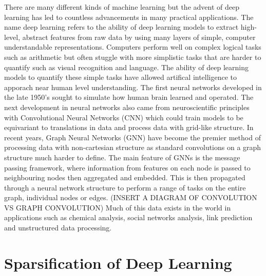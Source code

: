 \documentclass[honours,12pt]{unswthesis}
\numberwithin{equation}{section}
\begin{document}
{\noindent}There are many different kinds of machine learning but the advent of deep learning has led to countless advancements in many practical applications.
The name deep learning refers to the ability of deep learning models to extract high-level, abstract features from raw data by using many layers of simple, computer understandable representations.
Computers perform well on complex logical tasks such as arithmetic but often stuggle with more simplistic tasks that are harder to quantify such as visual recognition and language. 
The ability of deep learning models to quantify these simple tasks have allowed artifical intelligence to apporach near human level understanding.\cite{Goodfellow-et-al-2016} 
The first neural networks developed in the late 1950's sought to simulate how human brain learned and operated.\cite{Rosenblatt_1958}
The next development in neural networks also came from neuroscientific principles\cite{Hubel_Wiesel_1962} with Convolutional Neural Networks (CNN) which could train models to be equivariant to translations in data and process data with grid-like structure. 
In recent years, Graph Neural Networks (GNN) have become the premier method of processing data with non-cartesian structure as standard convolutions on a graph structure much harder to define.
The main feature of GNNs is the message passing framework, where information from features on each node is passed to neighbouring nodes then aggregated and embedded. 
This is then propagated through a neural network structure to perform a range of tasks on the entire graph, individual nodes or edges.
(INSERT A DIAGRAM OF CONVOLUTION VS GRAPH CONVOLUTION)
Much of this data exists in the world in applications such as chemical analysis\cite{xu2022chemistry}, social networks analysis\cite{rath2020detecting}, link prediction\cite{zhang2020revisiting} and unstructured data processing\cite{nouri2021improving}.

{\section{Sparsification of Deep Learning}}\label{sparsification}
\end{document}
